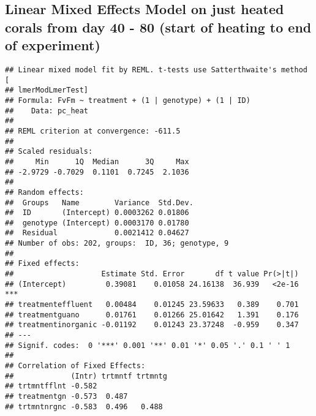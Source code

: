 \documentclass[
]{article}
\newenvironment{Shaded}{\begin{snugshade}}{\end{snugshade}}
\newcommand{\AttributeTok}[1]{\textcolor[rgb]{0.13,0.29,0.53}{#1}}
\newcommand{\CommentTok}[1]{\textcolor[rgb]{0.56,0.35,0.01}{\textit{#1}}}
\newcommand{\DecValTok}[1]{\textcolor[rgb]{0.00,0.00,0.81}{#1}}
\newcommand{\FunctionTok}[1]{\textcolor[rgb]{0.13,0.29,0.53}{\textbf{#1}}}
\newcommand{\NormalTok}[1]{#1}
\newcommand{\OtherTok}[1]{\textcolor[rgb]{0.56,0.35,0.01}{#1}}
\newcommand{\SpecialCharTok}[1]{\textcolor[rgb]{0.81,0.36,0.00}{\textbf{#1}}}
\newcommand{\StringTok}[1]{\textcolor[rgb]{0.31,0.60,0.02}{#1}}
\begin{document}
\hypertarget{linear-mixed-effects-model-on-just-heated-corals-from-day-40---80-start-of-heating-to-end-of-experiment}{%
\subsection{Linear Mixed Effects Model on just heated corals from day 40
- 80 (start of heating to end of
experiment)}\label{linear-mixed-effects-model-on-just-heated-corals-from-day-40---80-start-of-heating-to-end-of-experiment}}

\begin{Shaded}
\end{Shaded}

\begin{verbatim}
## Linear mixed model fit by REML. t-tests use Satterthwaite's method [
## lmerModLmerTest]
## Formula: FvFm ~ treatment + (1 | genotype) + (1 | ID)
##    Data: pc_heat
## 
## REML criterion at convergence: -611.5
## 
## Scaled residuals: 
##     Min      1Q  Median      3Q     Max 
## -2.9729 -0.7029  0.1101  0.7245  2.1036 
## 
## Random effects:
##  Groups   Name        Variance  Std.Dev.
##  ID       (Intercept) 0.0003262 0.01806 
##  genotype (Intercept) 0.0003170 0.01780 
##  Residual             0.0021412 0.04627 
## Number of obs: 202, groups:  ID, 36; genotype, 9
## 
## Fixed effects:
##                    Estimate Std. Error       df t value Pr(>|t|)    
## (Intercept)         0.39081    0.01058 24.16138  36.939   <2e-16 ***
## treatmenteffluent   0.00484    0.01245 23.59633   0.389    0.701    
## treatmentguano      0.01761    0.01266 25.01642   1.391    0.176    
## treatmentinorganic -0.01192    0.01243 23.37248  -0.959    0.347    
## ---
## Signif. codes:  0 '***' 0.001 '**' 0.01 '*' 0.05 '.' 0.1 ' ' 1
## 
## Correlation of Fixed Effects:
##             (Intr) trtmntf trtmntg
## trtmntfflnt -0.582                
## treatmentgn -0.573  0.487         
## trtmntnrgnc -0.583  0.496   0.488
\end{verbatim}
\end{document}
